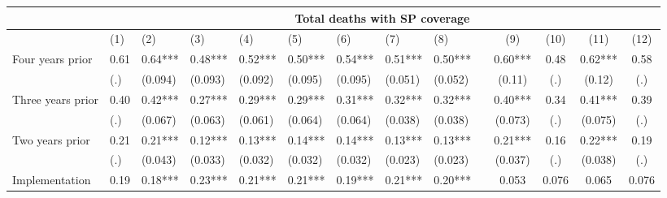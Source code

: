 \begin{tabular}{lccccrrrrrcccc}
\toprule
      & \multicolumn{13}{c}{Total deaths with SP coverage} \\
\midrule
      & \multicolumn{1}{l}{(1)} & \multicolumn{1}{l}{(2)} & \multicolumn{1}{l}{(3)} & \multicolumn{1}{l}{(4)} & \multicolumn{1}{l}{(5)} & \multicolumn{1}{l}{(6)} & \multicolumn{1}{l}{(7)} & \multicolumn{1}{l}{(8)} &       & (9)   & (10)  & (11)  & (12) \\
\midrule
\midrule
Four years prior & \multicolumn{1}{l}{0.61} & \multicolumn{1}{l}{0.64***} & \multicolumn{1}{l}{0.48***} & \multicolumn{1}{l}{0.52***} & \multicolumn{1}{l}{0.50***} & \multicolumn{1}{l}{0.54***} & \multicolumn{1}{l}{0.51***} & \multicolumn{1}{l}{0.50***} &       & 0.60*** & 0.48  & 0.62*** & 0.58 \\
      & \multicolumn{1}{l}{(.)} & \multicolumn{1}{l}{(0.094)} & \multicolumn{1}{l}{(0.093)} & \multicolumn{1}{l}{(0.092)} & \multicolumn{1}{l}{(0.095)} & \multicolumn{1}{l}{(0.095)} & \multicolumn{1}{l}{(0.051)} & \multicolumn{1}{l}{(0.052)} &       & (0.11) & (.)   & (0.12) & (.) \\
Three years prior & \multicolumn{1}{l}{0.40} & \multicolumn{1}{l}{0.42***} & \multicolumn{1}{l}{0.27***} & \multicolumn{1}{l}{0.29***} & \multicolumn{1}{l}{0.29***} & \multicolumn{1}{l}{0.31***} & \multicolumn{1}{l}{0.32***} & \multicolumn{1}{l}{0.32***} &       & 0.40*** & 0.34  & 0.41*** & 0.39 \\
      & \multicolumn{1}{l}{(.)} & \multicolumn{1}{l}{(0.067)} & \multicolumn{1}{l}{(0.063)} & \multicolumn{1}{l}{(0.061)} & \multicolumn{1}{l}{(0.064)} & \multicolumn{1}{l}{(0.064)} & \multicolumn{1}{l}{(0.038)} & \multicolumn{1}{l}{(0.038)} &       & (0.073) & (.)   & (0.075) & (.) \\
Two years prior & \multicolumn{1}{l}{0.21} & \multicolumn{1}{l}{0.21***} & \multicolumn{1}{l}{0.12***} & \multicolumn{1}{l}{0.13***} & \multicolumn{1}{l}{0.14***} & \multicolumn{1}{l}{0.14***} & \multicolumn{1}{l}{0.13***} & \multicolumn{1}{l}{0.13***} &       & 0.21*** & 0.16  & 0.22*** & 0.19 \\
      & \multicolumn{1}{l}{(.)} & \multicolumn{1}{l}{(0.043)} & \multicolumn{1}{l}{(0.033)} & \multicolumn{1}{l}{(0.032)} & \multicolumn{1}{l}{(0.032)} & \multicolumn{1}{l}{(0.032)} & \multicolumn{1}{l}{(0.023)} & \multicolumn{1}{l}{(0.023)} &       & (0.037) & (.)   & (0.038) & (.) \\
Implementation & \multicolumn{1}{l}{0.19} & \multicolumn{1}{l}{0.18***} & \multicolumn{1}{l}{0.23***} & \multicolumn{1}{l}{0.21***} & \multicolumn{1}{l}{0.21***} & \multicolumn{1}{l}{0.19***} & \multicolumn{1}{l}{0.21***} & \multicolumn{1}{l}{0.20***} &       & 0.053 & 0.076 & 0.065 & 0.076 \\

\end{tabular}
